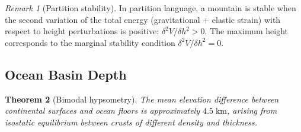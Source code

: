 \documentclass[10pt,twocolumn]{article}
\newtheorem{theorem}{Theorem}[section]
\theoremstyle{definition}
\theoremstyle{remark}
\newtheorem{remark}[theorem]{Remark}
\begin{document}
\begin{remark}[Partition stability]
In partition language, a mountain is stable when the
second variation of the total energy (gravitational +
elastic strain) with respect to height perturbations is
positive: $\delta^2 V/\delta h^2 > 0$.  The maximum height
corresponds to the marginal stability condition
$\delta^2 V/\delta h^2 = 0$.
\end{remark}

\subsection{Ocean Basin Depth}\label{sec:ocean}

\begin{theorem}[Bimodal hypsometry]\label{thm:ocean}
The mean elevation difference between continental surfaces and
ocean floors is approximately $4.5\;\mathrm{km}$, arising from
isostatic equilibrium between crusts of different density and
thickness.
\end{theorem}
\end{document}
